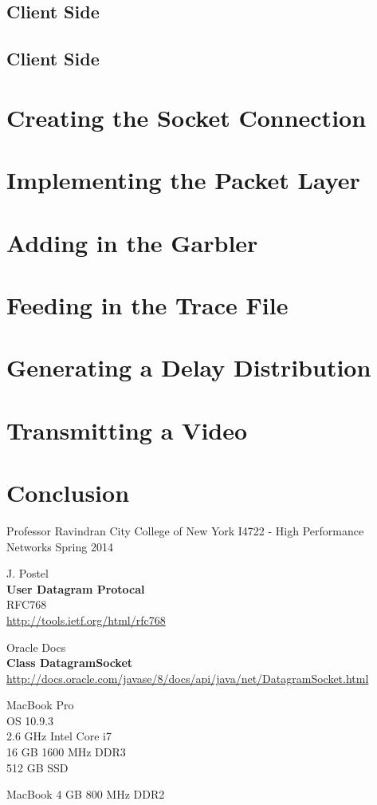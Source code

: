 \documentclass[twocolumn,nofootinbib,%
notitlepage,11pt]{report}
\begin{document}
\subsection*{Client Side}

\subsection*{Client Side}

\section*{Creating the Socket Connection}

\section*{Implementing the Packet Layer}

\section*{Adding in the Garbler}

\section*{Feeding in the Trace File}

\section*{Generating a Delay Distribution}

\section*{Transmitting a Video}

\section*{Conclusion}

\begin{thebibliography}{30}

Professor Ravindran
City College of New York
I4722 - High Performance Networks
Spring 2014

J. Postel\\
\textbf{User Datagram Protocal}\\
RFC768\\
\url{http://tools.ietf.org/html/rfc768}

Oracle Docs\\
\textbf{Class DatagramSocket}\\
\url{http://docs.oracle.com/javase/8/docs/api/java/net/DatagramSocket.html}

MacBook Pro\\
OS 10.9.3\\
2.6 GHz Intel Core i7\\
16 GB 1600 MHz DDR3\\
512 GB SSD

MacBook
4 GB 800 MHz DDR2

\end{thebibliography}
\end{document}
